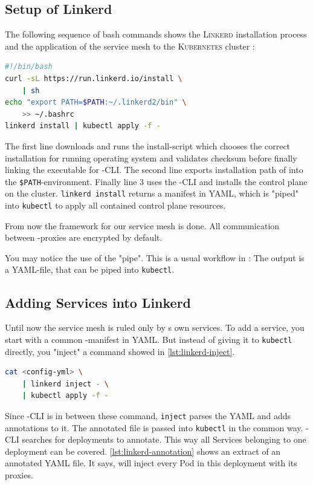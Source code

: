 \subsection{Setup of Linkerd}

The following sequence of bash commands shows the \textsc{Linkerd} installation process and the application of the service mesh to the \textsc{Kubernetes} cluster \cite{linkerd-get-started}:
\begin{lstlisting}[language=bash,caption={Setup of \textsc{Linkerd}}, label={lst:linkerd-setup}]
#!/bin/bash
curl -sL https://run.linkerd.io/install \
	| sh
echo "export PATH=$PATH:~/.linkerd2/bin" \
	>> ~/.bashrc
linkerd install | kubectl apply -f -
\end{lstlisting}
The first line downloads and runs the install-script which chooses the correct installation for running operating system and validates checksum before finally linking the executable for \linkerd{}-CLI.
The second line exports installation path of \linkerd{} into the \lstinline|$PATH|-environment. 
Finally line 3 uses the \linkerd{}-CLI and installs the control plane on the cluster.
\lstinline|linkerd install| returns a \kubernetes{} manifest in YAML, which is "piped" into \lstinline|kubectl| to apply all contained control plane resources.

From now the framework for our service mesh is done.
All communication between \linkerd{}-proxies are encrypted by default.

You may notice the use of the "pipe". 
This is a usual workflow in \linkerd{}: The output is a YAML-file, that can be piped into \lstinline|kubectl|.

\subsection{Adding Services into Linkerd}
Until now the service mesh is ruled only by \linkerd{}s own services.
To add a service, you start with a common \kubernetes{}-manifest in YAML.
But instead of giving it to \lstinline|kubectl| directly, you "inject" a \linkerd{} command showed in \autoref{lst:linkerd-inject}.
\begin{lstlisting}[language=bash,caption={Inject \textsc{Linkerd}-annotation into manifest.}, label={lst:linkerd-inject}]
cat <config-yml> \
	| linkerd inject - \
	| kubectl apply -f -
\end{lstlisting}
Since \linkerd{}-CLI is in between these command, \lstinline|inject| parses the YAML and adds annotations to it.
The annotated file is passed into \lstinline|kubectl| in the common way.
\linkerd{}-CLI searches for deployments to annotate.
This way all Services belonging to one deployment can be covered.
\autoref{lst:linkerd-annotation} shows an extract of an annotated YAML file.
It says, \linkerd{} will inject every Pod in this deployment with its proxies.

